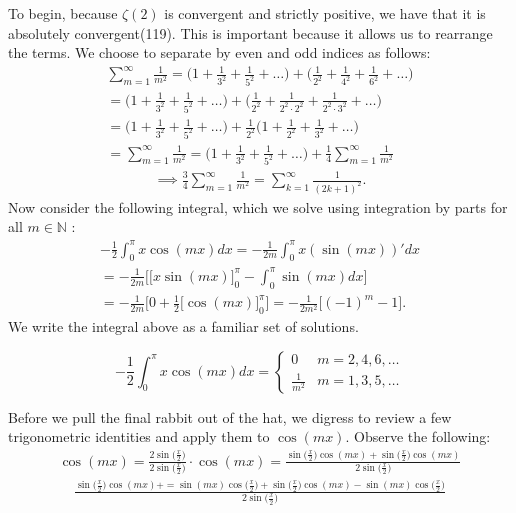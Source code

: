 \documentclass[12pt,oneside]{amsart}
\theoremstyle{definition}
\theoremstyle{remark}
\numberwithin{equation}{exer}
\newcommand{\smm}{\sum_{m=1}^\infty}
\newcommand{\sxx}{\sin{\big(\frac{x}{2}\big)}}
\newcommand{\cmx}{\cos{(mx)}}
\newcommand{\smx}{\sin{(mx)}}
\newcommand{\cxx}{\cos{\big(\frac{x}{2}\big)}}
\begin{document}
\newline \indent 
To begin, because  $\zeta (2)$ is convergent and strictly positive, we have that it is absolutely convergent\cite{MR4071523}(119). This is important because it allows us to rearrange the terms. We choose to separate by even and odd indices as follows:
\begin{align*}
    \smm \frac{1}{m^2}= \Big( 1 + \frac{1}{3^2} + \frac{1}{5^2} + \dots \Big) + \Big(\frac{1}{2^2} + \frac{1}{4^2}+\frac{1}{6^2} + \dots \Big)\\
    = \Big( 1 + \frac{1}{3^2} + \frac{1}{5^2} + \dots \Big)
    + \Big( \frac{1}{2^2} + \frac{1}{2^2 \cdot 2^2} + \frac{1}{2^2\cdot3^2}+\dots \Big)\\
    =  \Big( 1 + \frac{1}{3^2} + \frac{1}{5^2} + \dots \Big) + \frac{1}{2^2}\Big( 1 + \frac{1}{2^2} + \frac{1}{3^2} + \dots \Big)\\
    =\smm \frac{1}{m^2} = \Big( 1 + \frac{1}{3^2} + \frac{1}{5^2} + \dots \Big) + \frac{1}{4}\smm \frac{1}{m^2}
\end{align*}  
\begin{align}
        \implies \frac{3}{4}\smm \frac{1}{m^2} = \sum_{k=1}^\infty \frac{1}{(2k+1)^2}.
\end{align}
\newline \indent
Now consider the following integral, which we solve using integration by parts for all $ m  \in \mathbb{N}$ :
\begin{align*}
    -\frac{1}{2} \int_0^\pi x\cos{(mx)}dx
    = -\frac{1}{2m} \int_0^\pi x(\sin{(mx)})'dx \\
    =-\frac{1}{2m} \bigg[ \big[x\sin{(mx)}\big]_0^\pi - \int_0^\pi \sin{(mx)}dx\bigg]\\
    =-\frac{1}{2m} \bigg[0 + \frac{1}{2} \big[\cos{(mx)}\big]_0^\pi\bigg] 
    = -\frac{1}{2m^2}\big[(-1)^m - 1 \big].
\end{align*}
\indent 
We write the integral above as a familiar set of solutions.

    \begin{equation}
      -\frac{1}{2} \int_0^\pi x\cos{(mx)}dx = \begin{cases}
               0               & m=2,4,6,\dots\\
               \frac{1}{m^2}              & m= 1,3,5, \dots
           \end{cases}
\end{equation}
\indent

Before we pull the final rabbit out of the hat, we digress to review a few trigonometric identities and apply them to $\cos{(mx)}$. Observe the following:
\newline
\begin{align*}
    \cos{(mx)} = \frac{2\sin{\big(\frac{x}{2}\big)}}{2\sxx} \cdot \cos{(mx)}
    =\frac{\sxx\cmx + \sxx \cmx}{2\sxx}
\end{align*}
\begin{align*}
    \frac{\sxx\cmx + =\smx\cxx+\sxx\cmx-\smx\cxx}{2\sxx}
\end{align*}    
\end{document}
